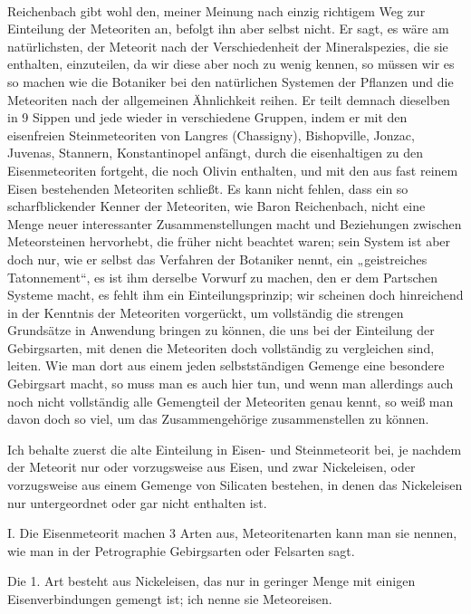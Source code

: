 \documentclass[a4paper, 11pt, oneside]{article}
\begin{document}
\paragraph{}
Reichenbach gibt wohl den, meiner Meinung nach einzig richtigem Weg zur Einteilung der Meteoriten an, befolgt ihn aber selbst nicht. Er sagt, es wäre am natürlichsten, der Meteorit nach der Verschiedenheit der Mineralspezies, die sie enthalten, einzuteilen, da wir diese aber noch zu wenig kennen, so müssen wir es so machen wie die Botaniker bei den natürlichen Systemen der Pflanzen und die Meteoriten nach der allgemeinen Ähnlichkeit reihen. Er teilt demnach dieselben in 9 Sippen und jede wieder in verschiedene Gruppen, indem er mit den eisenfreien Steinmeteoriten von Langres (Chassigny), Bishopville, Jonzac, Juvenas, Stannern, Konstantinopel anfängt, durch die eisenhaltigen zu den Eisenmeteoriten fortgeht, die noch Olivin enthalten, und mit den aus fast reinem Eisen bestehenden Meteoriten schließt. Es kann nicht fehlen, dass ein so scharfblickender Kenner der Meteoriten, wie Baron Reichenbach, nicht eine Menge neuer interessanter Zusammenstellungen macht und Beziehungen zwischen Meteorsteinen hervorhebt, die früher nicht beachtet waren; sein System ist aber doch nur, wie er selbst das Verfahren der Botaniker nennt, ein „geistreiches Tatonnement“, es ist ihm derselbe Vorwurf zu machen, den er dem Partschen Systeme macht, es fehlt ihm ein Einteilungsprinzip; wir scheinen doch hinreichend in der Kenntnis der Meteoriten vorgerückt, um vollständig die strengen Grundsätze in Anwendung bringen zu können, die uns bei der Einteilung der Gebirgsarten, mit denen die Meteoriten doch vollständig zu vergleichen sind, leiten. Wie man dort aus einem jeden selbstständigen Gemenge eine besondere Gebirgsart macht, so muss man es auch hier tun, und wenn man allerdings auch noch nicht vollständig alle Gemengteil der Meteoriten genau kennt, so weiß man davon doch so viel, um das Zusammengehörige zusammenstellen zu können.

Ich behalte zuerst die alte Einteilung in Eisen- und Steinmeteorit bei, je nachdem der Meteorit nur oder vorzugsweise aus Eisen, und zwar Nickeleisen, oder vorzugsweise aus einem Gemenge von Silicaten bestehen, in denen das Nickeleisen nur untergeordnet oder gar nicht enthalten ist.

I. Die Eisenmeteorit machen 3 Arten aus, Meteoritenarten kann man sie nennen, wie man in der Petrographie Gebirgsarten oder Felsarten sagt.

Die 1. Art besteht aus Nickeleisen, das nur in geringer Menge mit einigen Eisenverbindungen gemengt ist; ich nenne sie Meteoreisen.
\end{document}

